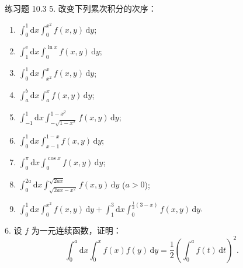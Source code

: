 \begin{exblock}{练习题 10.3}
5. 改变下列累次积分的次序：
\begin{enumerate}
\item $\int_0^1 \mathrm{d}x \int_0^{x^2} f(x, y)\,\mathrm{d}y$;
\item $\int_1^{\mathrm{e}} \mathrm{d}x \int_0^{\ln x} f(x, y)\,\mathrm{d}y$;
\item $\int_0^1 \mathrm{d}x \int_{x^2}^x f(x, y)\,\mathrm{d}y$;
\item $\int_a^b \mathrm{d}x \int_a^x f(x, y)\,\mathrm{d}y$;
\item $\int_{-1}^1 \mathrm{d}x \int_{-\sqrt{1-x^2}}^{1-x^2} f(x, y)\,\mathrm{d}y$;
\item $\int_0^1 \mathrm{d}x \int_{x-1}^{1-x} f(x, y)\,\mathrm{d}y$;
\item $\int_0^\pi \mathrm{d}x \int_0^{\cos x} f(x, y)\,\mathrm{d}y$;
\item $\int_0^{2a} \mathrm{d}x \int_{\sqrt{2ax-x^2}}^{\sqrt{2ax}} f(x, y)\,\mathrm{d}y$ ($a > 0$);
\item $\int_0^1 \mathrm{d}x \int_0^{x^2} f(x, y)\,\mathrm{d}y + \int_1^3 \mathrm{d}x \int_0^{\frac{1}{2}(3-x)} f(x, y)\,\mathrm{d}y$.
\end{enumerate}

6. 设 $f$ 为一元连续函数，证明：
\[
\int_0^a \mathrm{d}x \int_0^x f(x) f(y)\,\mathrm{d}y = \frac{1}{2} \left( \int_0^a f(t)\,\mathrm{d}t \right)^2.
\]
\end{exblock}
